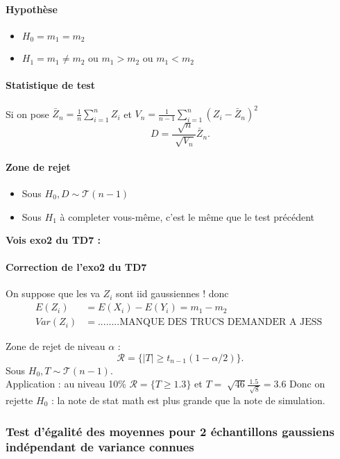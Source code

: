 \documentclass{article}
\theoremstyle{plain}%
\theoremstyle{definition}
\theoremstyle{remark}
\begin{document}
\paragraph*{Hypothèse}
\begin{itemize}
    \item $ H_0 = m_1 = m_2 $ 
    \item $ H_1 = m_1 \neq m_2 $ ou $ m_1 > m_2 $ ou $ m_1 < m_2 $ 
\end{itemize}

\paragraph*{Statistique de test}
Si on pose $ \bar{Z}_n = \frac{1}{n} \sum_{i=1}^{n}Z_i $ et $ V_n = \frac{1}{n-1}\sum_{i=1}^{n}(Z_i - \bar{Z}_n)^2 $ 
\[
    D = \frac{\sqrt[]{n}}{\sqrt[]{V_n}}\bar{Z}_n
.\]

\paragraph*{Zone de rejet}
\begin{itemize}
    \item Sous $ H_0, D \sim \mathcal{T}(n-1) $
    \item Sous $ H_1 $ à completer vous-même, c'est le même que le test précédent
\end{itemize}

\textbf{Vois exo2 du TD7 : }
\paragraph*{Correction de l'exo2 du TD7} On suppose que les va $ Z_i $ sont iid gaussiennes ! donc \begin{align*}
    E(Z_i) &= E(X_i) - E(Y_i) = m_1 - m_2 \\
    Var(Z_i) &= ........ \text{MANQUE DES TRUCS DEMANDER A JESS }
\end{align*}

Zone de rejet de niveau $ \alpha  $ : 
\[
    \mathcal{R} = \{\left| T \right| \geq t_{n-1} (1- \alpha /2)\}
.\]
Sous $ H_0, T \sim \mathcal{T}(n-1) $. \\
Application : au niveau 10\% $ \mathcal{R}=\{T \geq 1.3\} $ et $ T = \sqrt[]{46}\frac{1.5}{\sqrt[]{8}} = 3.6 $ Donc on rejette $ H_0 $ : la note de stat math est plus grande que la note de simulation.


\subsubsection{Test d'égalité des moyennes pour 2 échantillons gaussiens indépendant de variance connues}
\end{document}
